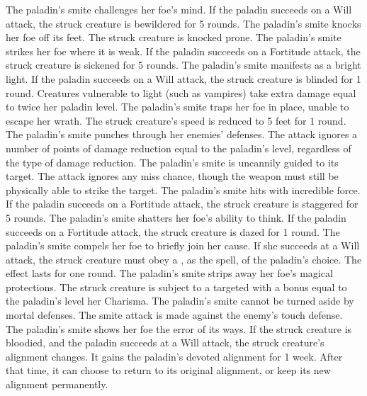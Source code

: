  The paladin's smite challenges her foe's mind. If the paladin succeeds on a Will attack, the struck creature is bewildered for 5 rounds.
 The paladin's smite knocks her foe off its feet. The struck creature is knocked prone.
 The paladin's smite strikes her foe where it is weak. If the paladin succeeds on a Fortitude attack, the struck creature is sickened for 5 rounds.
 The paladin's smite manifests as a bright light. If the paladin succeeds on a Will attack, the struck creature is blinded for 1 round. Creatures vulnerable to light (such as vampires) take extra damage equal to twice her paladin level.
 The paladin's smite traps her foe in place, unable to escape her wrath. The struck creature's speed is reduced to 5 feet for 1 round.
 The paladin's smite punches through her enemies' defenses. The attack ignores a number of points of damage reduction equal to the paladin's level, regardless of the type of damage reduction.
 The paladin's smite is uncannily guided to its target. The attack ignores any miss chance, though the weapon must still be physically able to strike the target.
 The paladin's smite hits with incredible force. If the paladin succeeds on a Fortitude attack, the struck creature is staggered for 5 rounds.
 The paladin's smite shatters her foe's ability to think. If the paladin succeeds on a Fortitude attack, the struck creature is dazed for 1 round.
 The paladin's smite compels her foe to briefly join her cause. If she succeeds at a Will attack, the struck creature must obey a , as the spell, of the paladin's choice. The effect lasts for one round.
 The paladin's smite strips away her foe's magical protections. The struck creature is subject to a targeted  with a bonus equal to the paladin's level \add her Charisma.
 The paladin's smite cannot be turned aside by mortal defenses. The smite attack is made against the enemy's touch defense.
 The paladin's smite shows her foe the error of its ways. If the struck creature is bloodied, and the paladin succeeds at a Will attack, the struck creature's alignment changes. It gains the paladin's devoted alignment for 1 week. After that time, it can choose to return to its original alignment, or keep its new alignment permanently.

